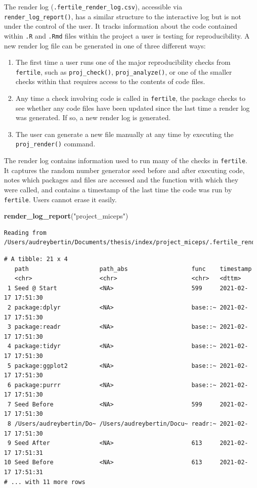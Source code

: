 \documentclass[12pt,twoside]{reedthesis}
\newenvironment{Shaded}{\begin{snugshade}}{\end{snugshade}}
\newcommand{\KeywordTok}[1]{\textcolor[rgb]{0.13,0.29,0.53}{\textbf{#1}}}
\newcommand{\NormalTok}[1]{#1}
\newcommand{\StringTok}[1]{\textcolor[rgb]{0.31,0.60,0.02}{#1}}
\begin{document}
The render log (\texttt{.fertile\_render\_log.csv}), accessible via \texttt{render\_log\_report()}, has a similar structure to the interactive log but is not under the control of the user. It tracks information about the code contained within \texttt{.R} and \texttt{.Rmd} files within the project a user is testing for reproducibility. A new render log file can be generated in one of three different ways:
\begin{enumerate}
\def\labelenumi{\arabic{enumi}.}
\item
  The first time a user runs one of the major reproducibility checks from \texttt{fertile}, such as \texttt{proj\_check()}, \texttt{proj\_analyze()}, or one of the smaller checks within that requires access to the contents of code files.
\item
  Any time a check involving code is called in \texttt{fertile}, the package checks to see whether any code files have been updated since the last time a render log was generated. If so, a new render log is generated.
\item
  The user can generate a new file manually at any time by executing the \texttt{proj\_render()} command.
\end{enumerate}
The render log contains information used to run many of the checks in \texttt{fertile}. It captures the random number generator seed before and after executing code, notes which packages and files are accessed and the function with which they were called, and contains a timestamp of the last time the code was run by \texttt{fertile}. Users cannot erase it easily.
\begin{Shaded}
\begin{Highlighting}[]
\KeywordTok{render_log_report}\NormalTok{(}\StringTok{"project_miceps"}\NormalTok{)}
\end{Highlighting}
\end{Shaded}
\begin{verbatim}
Reading from /Users/audreybertin/Documents/thesis/index/project_miceps/.fertile_render_log.csv
\end{verbatim}
\begin{verbatim}
# A tibble: 21 x 4
   path                    path_abs                  func    timestamp          
   <chr>                   <chr>                     <chr>   <dttm>             
 1 Seed @ Start            <NA>                      599     2021-02-17 17:51:30
 2 package:dplyr           <NA>                      base::~ 2021-02-17 17:51:30
 3 package:readr           <NA>                      base::~ 2021-02-17 17:51:30
 4 package:tidyr           <NA>                      base::~ 2021-02-17 17:51:30
 5 package:ggplot2         <NA>                      base::~ 2021-02-17 17:51:30
 6 package:purrr           <NA>                      base::~ 2021-02-17 17:51:30
 7 Seed Before             <NA>                      599     2021-02-17 17:51:30
 8 /Users/audreybertin/Do~ /Users/audreybertin/Docu~ readr:~ 2021-02-17 17:51:30
 9 Seed After              <NA>                      613     2021-02-17 17:51:31
10 Seed Before             <NA>                      613     2021-02-17 17:51:31
# ... with 11 more rows
\end{verbatim}
\end{document}
